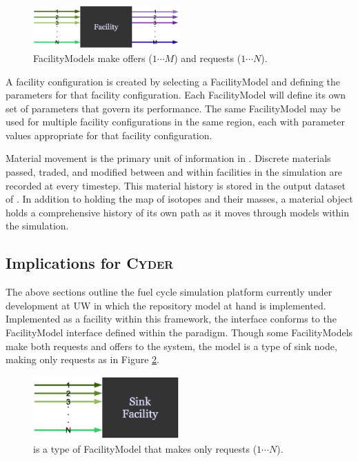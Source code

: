 \begin{figure}[htb!]
  \begin{center}
    \includegraphics[width=0.5\textwidth]{./chapters/paradigm/facility.eps}
  \end{center}
  \caption[\Cyclus FacilityModel offer and request interface.]{\Cyclus FacilityModels make offers ($1\cdots M$) and requests ($1\cdots N$).}
  \label{fig:facility}
\end{figure}


A facility configuration is created by selecting a FacilityModel and 
defining the parameters for that facility configuration.
Each FacilityModel will define its own set of parameters that 
govern its performance.  The same FacilityModel may be used for 
multiple facility configurations in the same region, each with 
parameter values appropriate for that facility configuration.



Material movement is the primary unit of information in \Cyclus.  
Discrete materials passed, traded, and modified between and within facilities 
in the simulation are recorded at every timestep.  This material 
history is stored in the output dataset of \Cyclus. In addition to 
holding the map of isotopes and their masses, a material object holds 
a comprehensive history of its own path as it moves through models 
within the simulation. 

\subsection{Implications for \textsc{Cyder}}

The above sections outline the fuel cycle simulation platform
currently under development at \gls{UW} in which the \Cyder repository model
at hand is implemented.  Implemented as a facility within this 
framework, the \Cyder interface conforms to the FacilityModel 
interface defined within the \Cyclus paradigm. Though some FacilityModels 
make both requests and offers to the system, the \Cyder model is a type 
of sink node, making only requests as in Figure \ref{fig:sinkfacility}.

\begin{figure}[htb!]
  \begin{center}
    \includegraphics[width=0.5\textwidth]{./chapters/paradigm/sinkfacility.eps}
  \end{center}
  \caption[\Cyder request-only interface.]{\Cyder is a type of \Cyclus FacilityModel that makes only requests 
  ($1\cdots N$).}
  \label{fig:sinkfacility}
\end{figure}

